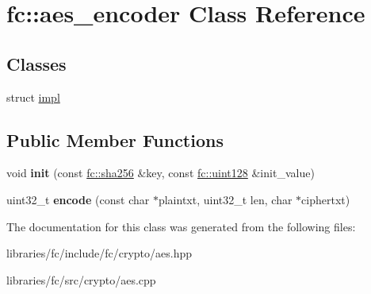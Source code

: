 \hypertarget{classfc_1_1aes__encoder}{}\section{fc\+:\+:aes\+\_\+encoder Class Reference}
\label{classfc_1_1aes__encoder}
\subsection*{Classes}
\begin{DoxyCompactItemize}
\item 
struct \mbox{\hyperlink{structfc_1_1aes__encoder_1_1impl}{impl}}
\end{DoxyCompactItemize}
\subsection*{Public Member Functions}
\begin{DoxyCompactItemize}
\item 
\mbox{\label{classfc_1_1aes__encoder_a6b8e4c5453abc12a7a4a9ae6b4fad479}} 
void {\bfseries init} (const \mbox{\hyperlink{classfc_1_1sha256}{fc\+::sha256}} \&key, const \mbox{\hyperlink{classfc_1_1uint128}{fc\+::uint128}} \&init\+\_\+value)
\item 
\mbox{\label{classfc_1_1aes__encoder_afe9b0c8cbe2b03143a1d1bfcdcc5319f}} 
uint32\+\_\+t {\bfseries encode} (const char $\ast$plaintxt, uint32\+\_\+t len, char $\ast$ciphertxt)
\end{DoxyCompactItemize}


The documentation for this class was generated from the following files\+:\begin{DoxyCompactItemize}
\item 
libraries/fc/include/fc/crypto/aes.\+hpp\item 
libraries/fc/src/crypto/aes.\+cpp\end{DoxyCompactItemize}
